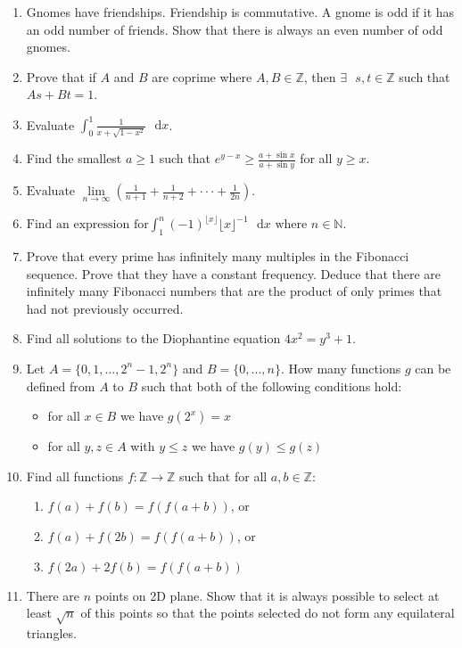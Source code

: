 \documentclass{article}
\begin{document}
\begin{enumerate}
    \item
    Gnomes have friendships. Friendship is commutative. A gnome is odd if it has an odd number of friends. Show that there is always an even number of odd gnomes.
    
    \item
    Prove that if $A$ and $B$ are coprime where $A,B \in \mathbb{Z}$, then $\exists \text{ } s,t \in \mathbb{Z}$ such that $As+Bt=1$.
    
    \item
    Evaluate $\int_{0}^{1} \frac{1}{x+\sqrt{1-x^2}}  \text{ } \mathrm{d}x$.
    
    \item
    Find the smallest $a \geq 1$ such that $e^{y - x} \geq \frac{a + \sin x}{a + \sin y}$ for all $y \geq x$.
    
    \item
    $
        \text{Evaluate } \lim\limits_{n\to\infty} (\frac{1}{n+1} + \frac{1}{n+2} + \cdot \cdot \cdot + \frac{1}{2n})\text{.}
    $
    
    
    \item
    $
        \text{Find an expression for} \int_{1}^{n} (-1)^{\lfloor x \rfloor} \lfloor x \rfloor^{-1} \text{ } \mathrm{d}x \text{ where } n \in \mathbb{N}.
    $
    
    \item
    Prove that every prime has infinitely many multiples in the Fibonacci sequence. Prove that they have a constant frequency. Deduce that there are infinitely many Fibonacci numbers that are the product of only primes that had not previously occurred.
    
    \item
    Find all solutions to the Diophantine equation $4x^2 = y^3 + 1$.
    
    \item 
    Let $A = \{0, 1, ..., 2^n - 1, 2^n\}$ and $B = \{0, ..., n \}$. How many functions $g$ can be defined from $A$ to $B$ such that both of the following conditions hold:
    \begin{itemize}
        \item for all $x \in B$ we have $g(2^x) = x$
        \item for all $y, z \in A$ with $y \leq z$ we have $g(y) \leq g(z)$
    \end{itemize}
    
    
    \item
    Find all functions $f: \mathbb{Z} \to \mathbb{Z}$ such that for all $a,b \in \mathbb{Z}$:
    \begin{enumerate}
        \item $f(a)+f(b) = f(f(a+b))$, or
        \item $f(a)+f(2b) = f(f(a+b))$, or
        \item $f(2a)+2f(b) = f(f(a+b))$
    \end{enumerate}
    
    \item
    There are $n$ points on 2D plane. Show that it is always possible to select at least $\sqrt{n}$ of this points so that the points selected do not form any equilateral triangles.
\end{enumerate}
\end{document}
